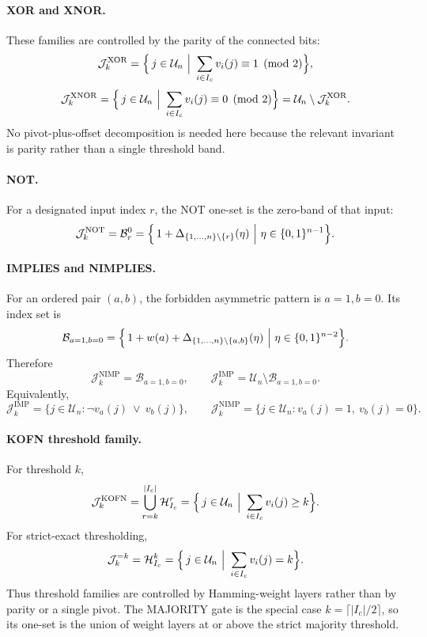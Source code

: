 \documentclass[11pt]{article}
\theoremstyle{definition}
\newcommand{\U}{\mathcal{U}_n}
\newcommand{\Ic}{I_c}
\newcommand{\J}{\mathcal{J}}
\newcommand{\Band}[2]{\mathcal{B}_{#1}^{#2}}
\newcommand{\Weight}[2]{\mathcal{H}_{#1}^{#2}}
\newcommand{\bits}{\{0,1\}}
\begin{document}
\paragraph{XOR and XNOR.}
These families are controlled by the parity of the connected bits:
\[
\J_k^{\mathrm{XOR}}
=
\Bigl\{\,j\in\U\ \Big|\
\sum_{i\in\Ic}v_i(j)\equiv 1\pmod 2
\Bigr\},
\]
\[
\J_k^{\mathrm{XNOR}}
=
\Bigl\{\,j\in\U\ \Big|\
\sum_{i\in\Ic}v_i(j)\equiv 0\pmod 2
\Bigr\}
=
\U\setminus\J_k^{\mathrm{XOR}}.
\]
No pivot-plus-offset decomposition is needed here because the relevant invariant is parity rather than a single threshold band.

\paragraph{NOT.}
For a designated input index \(r\), the NOT one-set is the zero-band of that input:
\[
\J_k^{\mathrm{NOT}}=\Band{r}{0}
=
\Bigl\{\,1+\Delta_{\{1,\dots,n\}\setminus\{r\}}(\eta)\ \Big|\
\eta\in\bits^{n-1}\Bigr\}.
\]

\paragraph{IMPLIES and NIMPLIES.}
For an ordered pair \((a,b)\), the forbidden asymmetric pattern is \(a=1,b=0\). Its index set is
\[
\mathcal{B}_{a=1,b=0}
=
\Bigl\{\,1+w(a)+\Delta_{\{1,\dots,n\}\setminus\{a,b\}}(\eta)\ \Big|\
\eta\in\bits^{n-2}\Bigr\}.
\]
Therefore
\[
\J_k^{\mathrm{NIMP}}=\mathcal{B}_{a=1,b=0},
\qquad
\J_k^{\mathrm{IMP}}=\U\setminus\mathcal{B}_{a=1,b=0}.
\]
Equivalently,
\[
\J_k^{\mathrm{IMP}}=\{j\in\U:\neg v_a(j)\ \lor\ v_b(j)\},
\qquad
\J_k^{\mathrm{NIMP}}=\{j\in\U:v_a(j)=1,\ v_b(j)=0\}.
\]

\paragraph{KOFN threshold family.}
For threshold \(k\),
\[
\J_k^{\mathrm{KOFN}}
=
\bigcup_{r=k}^{|\Ic|}\Weight{\Ic}{r}
=
\Bigl\{\,j\in\U\ \Big|\
\sum_{i\in\Ic} v_i(j)\ge k
\Bigr\}.
\]
For strict-exact thresholding,
\[
\J_k^{=k}=\Weight{\Ic}{k}
=
\Bigl\{\,j\in\U\ \Big|\
\sum_{i\in\Ic} v_i(j)=k
\Bigr\}.
\]
Thus threshold families are controlled by Hamming-weight layers rather than by parity or a single pivot. The MAJORITY gate is the special case \(k=\lceil|\Ic|/2\rceil\), so its one-set is the union of weight layers at or above the strict majority threshold.
\end{document}
